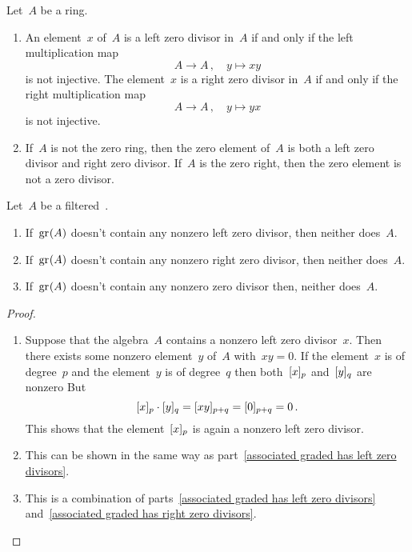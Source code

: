 \begin{remark}
	Let~$A$ be a ring.
	\begin{enumerate}
		\item
			An element~$x$ of~$A$ is a left zero divisor in~$A$ if and only if the left multiplication map
			\[
				A \to A \,,
				\quad
				y \mapsto xy
			\]
			is not injective.
			The element~$x$ is a right zero divisor in~$A$ if and only if the right multiplication map
			\[
				A \to A \,,
				\quad
				y \mapsto yx
			\]
			is not injective.
		\item
			If~$A$ is not the zero ring, then the zero element of~$A$ is both a left zero divisor and right zero divisor.
			If~$A$ is the zero right, then the zero element is not a zero divisor.
	\end{enumerate}
\end{remark}


\begin{proposition}
	\label{associated graded algebra and zero divisors}
	Let~$A$ be a filtered~{\algebra{$\kf$}}.
	\begin{enumerate}
		\item
			\label{associated graded has left zero divisors}
			If~$\gr(A)$ doesn’t contain any nonzero left zero divisor, then neither does~$A$.
		\item
			\label{associated graded has right zero divisors}
			If~$\gr(A)$ doesn’t contain any nonzero right zero divisor, then neither does~$A$.
		\item
			If~$\gr(A)$ doesn’t contain any nonzero zero divisor then, neither does~$A$.
	\end{enumerate}
\end{proposition}


\begin{proof}
	\leavevmode
	\begin{enumerate}
		\item
			Suppose that the algebra~$A$ contains a nonzero left zero divisor~$x$.
			Then there exists some nonzero element~$y$ of~$A$ with~$xy = 0$.
			If the element~$x$ is of degree~$p$ and the element~$y$ is of degree~$q$ then both~$\lbrack x\rbrack_p$ and~$\lbrack y\rbrack_q$ are nonzero
			But
			\[
				\lbrack x\rbrack_p \cdot \lbrack y\rbrack_q
				=
				\lbrack xy\rbrack_{p+q}
				=
				\lbrack 0 \rbrack_{p+q}
				=
				0 \,.
			\]
			This shows that the element~$\lbrack x\rbrack_p$ is again a nonzero left zero divisor.
		\item
			This can be shown in the same way as part~\ref*{associated graded has left zero divisors}.
		\item
			This is a combination of parts~\ref*{associated graded has left zero divisors} and~\ref*{associated graded has right zero divisors}.
		\qedhere
	\end{enumerate}
\end{proof}


